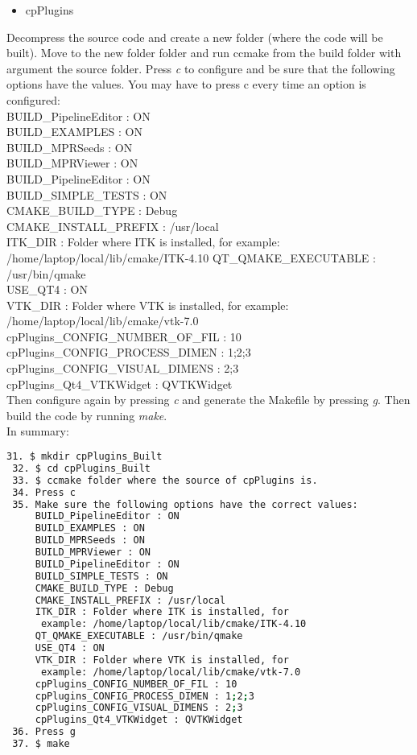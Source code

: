 \documentclass[12pt]{article}
\begin{document}
\begin{itemize}
\item cpPlugins
\end{itemize}
\begin{par}
Decompress the source code and create a new folder (where
the code will be built). Move to the new folder folder and run ccmake from the build folder with argument the
source folder. Press \textit{c} to configure and be sure that the following options have the values. You may have to press c every time an option is configured:\\

\noindent
BUILD\_PipelineEditor : ON\\
BUILD\_EXAMPLES : ON\\
BUILD\_MPRSeeds : ON\\
BUILD\_MPRViewer : ON\\
BUILD\_PipelineEditor : ON\\
BUILD\_SIMPLE\_TESTS : ON\\
CMAKE\_BUILD\_TYPE : Debug\\
CMAKE\_INSTALL\_PREFIX : /usr/local\\
ITK\_DIR : Folder where ITK is installed, for example: /home/laptop/local/lib/cmake/ITK-4.10
QT\_QMAKE\_EXECUTABLE : /usr/bin/qmake\\
USE\_QT4 : ON\\
VTK\_DIR : Folder where VTK is installed, for example: /home/laptop/local/lib/cmake/vtk-7.0\\
cpPlugins\_CONFIG\_NUMBER\_OF\_FIL : 10\\
cpPlugins\_CONFIG\_PROCESS\_DIMEN : 1;2;3\\ 
cpPlugins\_CONFIG\_VISUAL\_DIMENS : 2;3\\
cpPlugins\_Qt4\_VTKWidget : QVTKWidget\\

Then configure again by pressing \textit{c} and generate the Makefile by pressing \textit{g}.
Then build the code by running \textit{make}.\\

In summary:\\

\noindent
\small
\begin{lstlisting}[language=bash]
 31. $ mkdir cpPlugins_Built
 32. $ cd cpPlugins_Built
 33. $ ccmake folder where the source of cpPlugins is.
 34. Press c 
 35. Make sure the following options have the correct values:
     BUILD_PipelineEditor : ON
     BUILD_EXAMPLES : ON
     BUILD_MPRSeeds : ON
     BUILD_MPRViewer : ON
     BUILD_PipelineEditor : ON
     BUILD_SIMPLE_TESTS : ON
     CMAKE_BUILD_TYPE : Debug
     CMAKE_INSTALL_PREFIX : /usr/local
     ITK_DIR : Folder where ITK is installed, for 
      example: /home/laptop/local/lib/cmake/ITK-4.10
     QT_QMAKE_EXECUTABLE : /usr/bin/qmake
     USE_QT4 : ON
     VTK_DIR : Folder where VTK is installed, for 
      example: /home/laptop/local/lib/cmake/vtk-7.0
     cpPlugins_CONFIG_NUMBER_OF_FIL : 10
     cpPlugins_CONFIG_PROCESS_DIMEN : 1;2;3   
     cpPlugins_CONFIG_VISUAL_DIMENS : 2;3
     cpPlugins_Qt4_VTKWidget : QVTKWidget
 36. Press g
 37. $ make
 

\end{lstlisting}
\end{par}
\end{document}
